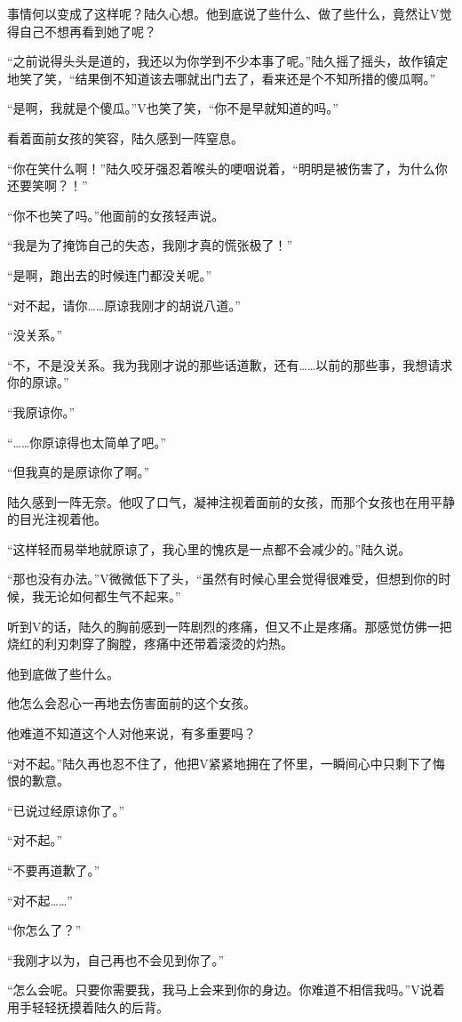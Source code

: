 事情何以变成了这样呢？陆久心想。他到底说了些什么、做了些什么，竟然让V觉得自己不想再看到她了呢？

“之前说得头头是道的，我还以为你学到不少本事了呢。”陆久摇了摇头，故作镇定地笑了笑，“结果倒不知道该去哪就出门去了，看来还是个不知所措的傻瓜啊。” 

“是啊，我就是个傻瓜。”V也笑了笑，“你不是早就知道的吗。”

看着面前女孩的笑容，陆久感到一阵窒息。

“你在笑什么啊！”陆久咬牙强忍着喉头的哽咽说着，“明明是被伤害了，为什么你还要笑啊？！”

“你不也笑了吗。”他面前的女孩轻声说。

“我是为了掩饰自己的失态，我刚才真的慌张极了！”

“是啊，跑出去的时候连门都没关呢。”

“对不起，请你……原谅我刚才的胡说八道。”

“没关系。”

“不，不是没关系。我为我刚才说的那些话道歉，还有……以前的那些事，我想请求你的原谅。”

“我原谅你。”

“……你原谅得也太简单了吧。”

“但我真的是原谅你了啊。”

陆久感到一阵无奈。他叹了口气，凝神注视着面前的女孩，而那个女孩也在用平静的目光注视着他。

“这样轻而易举地就原谅了，我心里的愧疚是一点都不会减少的。”陆久说。

“那也没有办法。”V微微低下了头，“虽然有时候心里会觉得很难受，但想到你的时候，我无论如何都生气不起来。”

听到V的话，陆久的胸前感到一阵剧烈的疼痛，但又不止是疼痛。那感觉仿佛一把烧红的利刃刺穿了胸膛，疼痛中还带着滚烫的灼热。

他到底做了些什么。

他怎么会忍心一再地去伤害面前的这个女孩。

他难道不知道这个人对他来说，有多重要吗？

“对不起。”陆久再也忍不住了，他把V紧紧地拥在了怀里，一瞬间心中只剩下了悔恨的歉意。

“已说过经原谅你了。”

“对不起。”

“不要再道歉了。”

“对不起……”

“你怎么了？”

“我刚才以为，自己再也不会见到你了。”

“怎么会呢。只要你需要我，我马上会来到你的身边。你难道不相信我吗。”V说着用手轻轻抚摸着陆久的后背。

